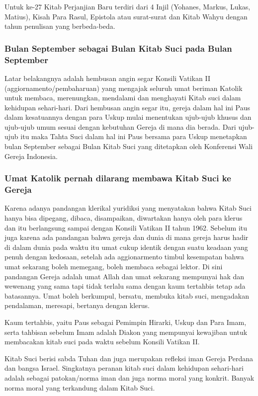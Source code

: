 Untuk ke-27 Kitab Perjanjian Baru terdiri dari 4 Injil (Yohanes, Markus, Lukas, Matius), Kisah Para Rasul, Epistola atau surat-surat dan Kitab Wahyu dengan tahun penulisan yang berbeda-beda.

\subsubsection*{Bulan September sebagai Bulan Kitab Suci pada Bulan September}
Latar belakangnya adalah hembusan angin segar Konsili Vatikan II (aggiornamento/pembaharuan) yang mengajak seluruh umat beriman Katolik untuk membaca, merenungkan, mendalami dan menghayati Kitab suci dalam kehidupan sehari-hari. Dari hembusan angin segar itu, gereja dalam hal ini Paus dalam kesatuannya dengan para Uskup mulai menentukan ujub-ujub khusus dan ujub-ujub umum sesuai dengan kebutuhan Gereja di mana dia berada. Dari ujub-ujub itu maka Tahta Suci dalam hal ini Paus bersama para Uskup menetapkan bulan September sebagai Bulan Kitab Suci yang ditetapkan oleh Konferensi Wali Gereja Indonesia.


\subsubsection*{Umat Katolik pernah dilarang membawa Kitab Suci ke Gereja}
Karena adanya pandangan klerikal yuridiksi yang menyatakan bahwa Kitab Suci hanya bisa dipegang, dibaca, disampaikan, diwartakan hanya oleh para klerus dan itu berlangsung sampai dengan Konsili Vatikan II tahun 1962. Sebelum itu juga karena ada pandangan bahwa gereja dan dunia di mana gereja harus hadir di dalam dunia pada waktu itu umat cukup identik dengan suatu keadaan yang penuh dengan kedosaan, setelah ada aggionarmento timbul kesempatan bahwa umat sekarang boleh memegang, boleh membaca sebagai lektor. Di sini pandangan Gereja adalah umat Allah dan umat sekarang mempunyai hak dan wewenang yang sama tapi tidak terlalu sama dengan kaum tertahbis tetap ada batasannya. Umat boleh berkumpul, bersatu, membuka kitab suci, mengadakan pendalaman, meresapi, bertanya dengan klerus.

Kaum tertahbis, yaitu Paus sebagai Pemimpin Hirarki, Uskup dan Para Imam, serta tahbisan sebelum Imam adalah Diakon yang mempunyai kewajiban untuk membacakan kitab suci pada waktu sebelum Konsili Vatikan II.

Kitab Suci berisi sabda Tuhan dan juga merupakan refleksi iman Gereja Perdana dan bangsa Israel. Singkatnya peranan kitab suci dalam kehidupan sehari-hari adalah sebagai patokan/norma iman dan juga norma moral yang konkrit. Banyak norma moral yang terkandung dalam Kitab Suci.

